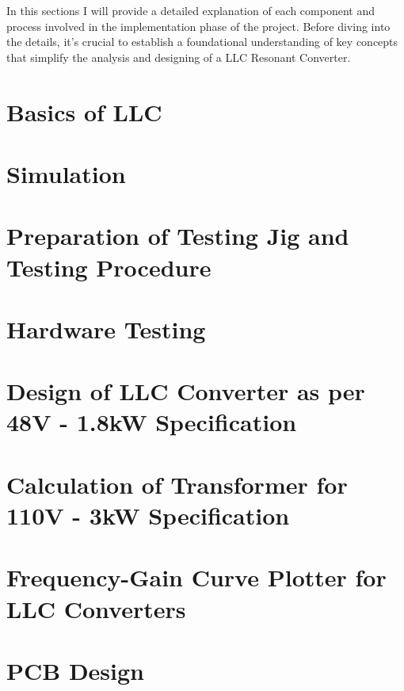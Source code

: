 In this sections I will provide a detailed explanation of each component and
process involved in the implementation phase of the project. Before diving into
the details, it's crucial to establish a foundational understanding of key
concepts that simplify the analysis and designing of a LLC Resonant Converter.

\section{Basics of LLC}

\section{Simulation}

\section{Preparation of Testing Jig and Testing Procedure}

\section{Hardware Testing}

\section{Design of LLC Converter as per 48V - 1.8kW Specification}

\section{Calculation of Transformer for 110V - 3kW Specification}

\section{Frequency-Gain Curve Plotter for LLC Converters}

\section{PCB Design}

